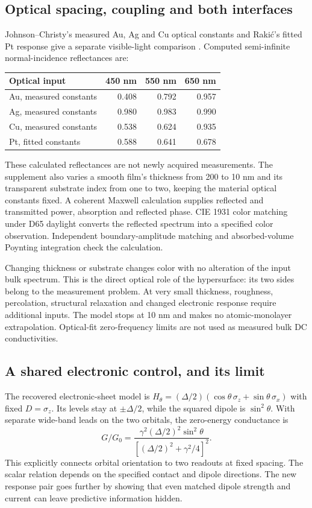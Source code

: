 \documentclass[11pt]{article}
\begin{document}
\subsection{Optical spacing, coupling and both interfaces}
Johnson--Christy's measured Au, Ag and Cu optical constants and Raki\'c's fitted Pt response give a separate visible-light comparison \cite{johnson,rakic}. Computed semi-infinite normal-incidence reflectances are:
\begin{center}
\begin{tabular}{lrrr}\toprule
Optical input & 450 nm & 550 nm & 650 nm\\\midrule
Au, measured constants & 0.408 & 0.792 & 0.957\\
Ag, measured constants & 0.980 & 0.983 & 0.990\\
Cu, measured constants & 0.538 & 0.624 & 0.935\\
Pt, fitted constants & 0.588 & 0.641 & 0.678\\\bottomrule
\end{tabular}
\end{center}
These calculated reflectances are not newly acquired measurements. The supplement also varies a smooth film's thickness from 200 to 10 nm and its transparent substrate index from one to two, keeping the material optical constants fixed. A coherent Maxwell calculation supplies reflected and transmitted power, absorption and reflected phase. CIE 1931 color matching under D65 daylight converts the reflected spectrum into a specified color observation. Independent boundary-amplitude matching and absorbed-volume Poynting integration check the calculation.

Changing thickness or substrate changes color with no alteration of the input bulk spectrum. This is the direct optical role of the hypersurface: its two sides belong to the measurement problem. At very small thickness, roughness, percolation, structural relaxation and changed electronic response require additional inputs. The model stops at 10 nm and makes no atomic-monolayer extrapolation. Optical-fit zero-frequency limits are not used as measured bulk DC conductivities.

\subsection{A shared electronic control, and its limit}
The recovered electronic-sheet model is $H_\theta=(\Delta/2)(\cos\theta\,\sigma_z+\sin\theta\,\sigma_x)$ with fixed $D=\sigma_z$. Its levels stay at $\pm\Delta/2$, while the squared dipole is $\sin^2\theta$. With separate wide-band leads on the two orbitals, the zero-energy conductance is
\begin{equation}
G/G_0=\frac{\gamma^2(\Delta/2)^2\sin^2\theta}
{[(\Delta/2)^2+\gamma^2/4]^2}.
\end{equation}
This explicitly connects orbital orientation to two readouts at fixed spacing. The scalar relation depends on the specified contact and dipole directions. The new response pair goes further by showing that even matched dipole strength and current can leave predictive information hidden.
\end{document}
